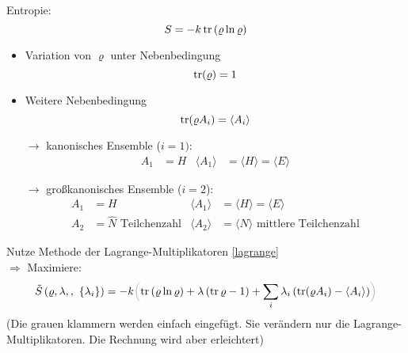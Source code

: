 Entropie: 
\begin{equation}
    S=-k \trace\left(\varrho \ln \varrho\right)
\end{equation}
\begin{itemize}
    \item Variation von $\varrho$ unter Nebenbedingung
    \begin{equation}
        \trace(\varrho) =1
    \end{equation}
    \item Weitere Nebenbedingung
    \begin{equation}
        \trace(\varrho A_i) =\langle A_i \rangle
    \end{equation}
    \item[$\rightarrow$] kanonisches Ensemble ($i=1)$:  
    \begin{align}
        A_1 &=H & \langle A_1\rangle&=\langle H\rangle=\langle E\rangle
    \end{align}
    \item[$\rightarrow$] großkanonisches Ensemble ($i=2$):
    \begin{align}
        A_1 &=H & \langle A_1\rangle&=\langle H\rangle=\langle E\rangle\\
        A_2 &= \hat{N} \text{ Teilchenzahl}& \langle A_2\rangle&= \langle N\rangle \text{ mittlere Teilchenzahl}
    \end{align}
\end{itemize}

Nutze Methode der Lagrange-Multiplikatoren \ref{lagrange}\\
$\Rightarrow$ Maximiere:
\begin{equation}
    \Tilde{S} \left(\varrho, \lambda, ,\ \{\lambda_i\}\right) = -k \color{black!30!white}\Bigl( \color{black} \trace \left( \varrho \ln\varrho \right) +\lambda\left( \trace \varrho -1\right) + \sum_i \lambda_i \left( \trace(\varrho A_i) -\langle A_i\rangle \right)  \color{black!30!white}\Bigr) \color{black}
\end{equation}
(Die grauen klammern werden einfach eingefügt. Sie verändern nur die Lagrange-Multiplikatoren. Die Rechnung wird aber erleichtert)

